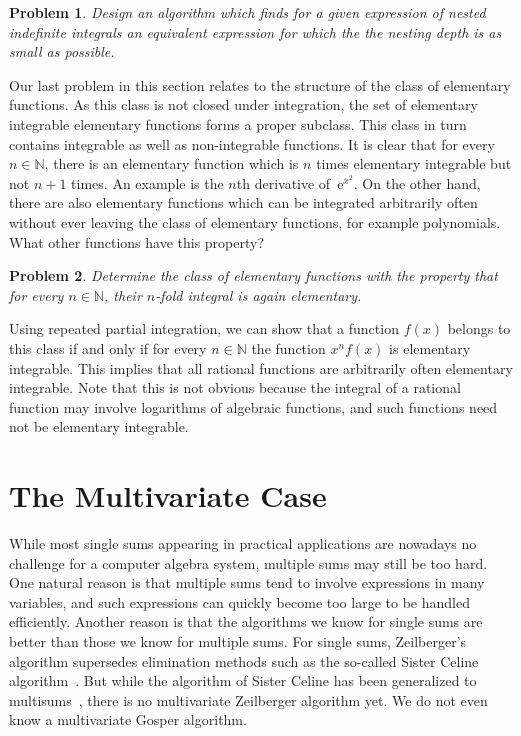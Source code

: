 \documentclass[a4paper,draft]{amsart}
\let\set\mathbb
\def\e{\mathrm{e}}
\newtheorem{problem}{Problem}
\begin{document}
 \begin{problem}
   Design an algorithm which finds for a given expression of nested indefinite integrals
   an equivalent expression for which the the nesting depth is as small as possible.
 \end{problem}


 Our last problem in this section relates to the structure of the class of elementary functions.
 As this class is not closed under integration, the set of elementary integrable elementary functions
 forms a proper subclass. This class in turn contains integrable as well as non-integrable functions.
 It is clear that for every $n\in\set N$, there is an elementary function which is $n$ times elementary
 integrable but not $n+1$ times. An example is the $n$th derivative of~$\e^{x^2}$. On the other hand, there
 are also elementary functions which can be integrated arbitrarily often without ever leaving the class of
 elementary functions, for example polynomials. What other functions have this property?

 \begin{problem}
   Determine the class of elementary functions with the property that for every
   $n\in\set N$, their $n$-fold integral is again elementary.
 \end{problem}

 Using repeated partial integration, we can show that a function $f(x)$ belongs to this class if and only
 if for every $n\in\set N$ the function $x^n f(x)$ is elementary integrable. This implies that all rational
 functions are arbitrarily often elementary integrable. Note that this is not obvious because the integral
 of a rational function may involve logarithms of algebraic functions, and such functions need not be
 elementary integrable.

 \section{The Multivariate Case}

 While most single sums appearing in practical applications are nowadays no
 challenge for a computer algebra system, multiple sums may still be too
 hard. One natural reason is that multiple sums tend to involve expressions in
 many variables, and such expressions can quickly become too large to be handled
 efficiently. Another reason is that the algorithms we know for single sums are
 better than those we know for multiple sums. For single sums, Zeilberger's
 algorithm supersedes elimination methods such as the so-called Sister Celine
 algorithm~\cite{fasenmyer49,verbaeten74,petkovsek97}. But while the algorithm
 of Sister Celine has been generalized to multisums~\cite{wilf92a,wegschaider97}, there
 is no multivariate Zeilberger algorithm yet. We do not even know a multivariate
 Gosper algorithm.
\end{document}
